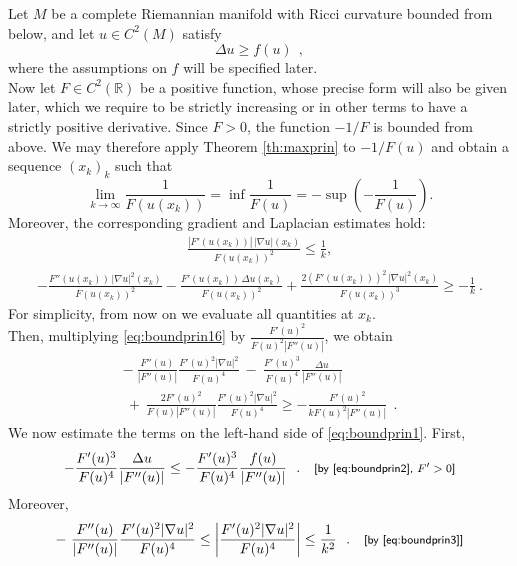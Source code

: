 \documentclass[a4paper,11pt,openright,twoside]{book}
\newcommand{\R}{\mathbb{R}}
\newcommand{\1}{\mathds{1}}
\newcommand{\commb}[1]{\textsf{{\footnotesize[#1]}}}
\theoremstyle{plain}
\theoremstyle{definition}
\theoremstyle{remark}
\begin{document}
Let $M$ be a complete Riemannian manifold with Ricci curvature bounded from below, and let $u\in C^2(M)$ satisfy
\begin{equation}\label{eq:boundprin2}
	\Delta u \geq f(u)\ \ , 
\end{equation}
where the assumptions on $f$ will be specified later.\\
Now let $F\in C^2(\R)$ be a positive function, whose precise form will also be given later, which we require to be strictly increasing or in other terms to have a strictly positive derivative.
Since $F>0$, the function $-1/F$ is bounded from above. We may therefore apply Theorem \ref{th:maxprin} to $-1/F(u)$ and obtain a sequence $(x_k)_k$ such that
\begin{equation}\label{eq:boundprin7}
	\lim_{k\to \infty} \frac{1}{F(u(x_k))} = \inf \frac{1}{F(u)}
	= -\sup\left(-\frac{1}{F(u)}\right).
\end{equation}
Moreover, the corresponding gradient and Laplacian estimates hold:
\begin{align}
	\frac{|F'(u(x_k))|\,|\nabla u|(x_k)}{F(u(x_k))^2}\le\frac{1}{k}, \label{eq:boundprin3}
\end{align}
\begin{align}\label{eq:boundprin16}
	-\frac{F''(u(x_k))\,|\nabla u|^2(x_k)}{F(u(x_k))^2}
	-\frac{F'(u(x_k))\,\Delta u(x_k)}{F(u(x_k))^2}
	+\frac{2(F'(u(x_k)))^2\,|\nabla u|^2(x_k)}{F(u(x_k))^3}
	\ge -\frac{1}{k}\ .
\end{align}
For simplicity, from now on we evaluate all quantities at $x_k$.\\
Then, multiplying \eqref{eq:boundprin16} by $\displaystyle \frac{F'(u)^2}{F(u)^2|F''(u)|}$, we obtain
\begin{multline}\label{eq:boundprin1}
	-\ \frac{F''(u)}{|F''(u)|} \frac{F'(u)^2|\nabla u|^2}{F(u)^4}
	\ -\ \frac{F'(u)^3}{F(u)^4}\frac{\Delta u}{|F''(u)|}\\
	\ +\ \frac{2F'(u)^2}{F(u)|F''(u)|} \frac{F'(u)^2|\nabla u|^2}{F(u)^4}
	\ge -\frac{F'(u)^2}{kF(u)^2|F''(u)|}\ \ .
\end{multline}
We now estimate the terms on the left-hand side of \eqref{eq:boundprin1}. First,
\begin{align*}
	-\frac{F'(u)^3}{F(u)^4}\frac{\Delta u}{|F''(u)|}
	\leq
	-\frac{F'(u)^3}{F(u)^4}\frac{f(u)}{|F''(u)|}
	\ \ . && \commb{by \eqref{eq:boundprin2}, $F'>0$}
\end{align*}
Moreover,
\begin{align*}
	-\ \frac{F''(u)}{|F''(u)|} \frac{F'(u)^2|\nabla u|^2}{F(u)^4}
	\leq
	\left| \frac{F'(u)^2|\nabla u|^2}{F(u)^4} \right|
	\leq \frac{1}{k^2}
	\ \ . && \commb{by \eqref{eq:boundprin3}}
\end{align*}
\end{document}
